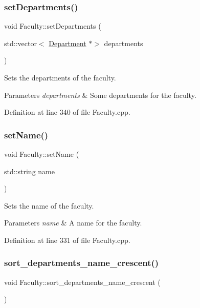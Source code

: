 \subsubsection{\texorpdfstring{set\+Departments()}{setDepartments()}}
{\footnotesize\ttfamily void Faculty\+::set\+Departments (\begin{DoxyParamCaption}\item[{std\+::vector$<$ \hyperlink{classDepartment}{Department} $\ast$$>$}]{departments }\end{DoxyParamCaption})}

Sets the departments of the faculty. 
\begin{DoxyParams}{Parameters}
{\em departments} & Some departments for the faculty. \\
\hline
\end{DoxyParams}


Definition at line 340 of file Faculty.\+cpp.

\mbox{\label{classFaculty_a0059fc30acc3f8d7477cde7a1e32a4d8}} 
\subsubsection{\texorpdfstring{set\+Name()}{setName()}}
{\footnotesize\ttfamily void Faculty\+::set\+Name (\begin{DoxyParamCaption}\item[{std\+::string}]{name }\end{DoxyParamCaption})}

Sets the name of the faculty. 
\begin{DoxyParams}{Parameters}
{\em name} & A name for the faculty. \\
\hline
\end{DoxyParams}


Definition at line 331 of file Faculty.\+cpp.

\mbox{\label{classFaculty_a7c88b74961f730faea3d5c4656580a40}} 
\subsubsection{\texorpdfstring{sort\+\_\+departments\+\_\+name\+\_\+crescent()}{sort\_departments\_name\_crescent()}}
{\footnotesize\ttfamily void Faculty\+::sort\+\_\+departments\+\_\+name\+\_\+crescent (\begin{DoxyParamCaption}{ }\end{DoxyParamCaption})}

